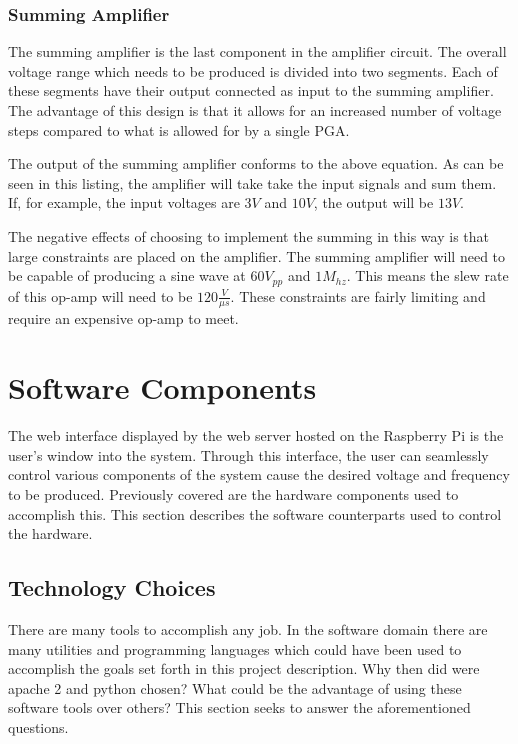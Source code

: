 \documentclass{article}	%
\begin{document}
\begin{multicols}{2}
\subsubsection{Summing Amplifier}
The summing amplifier is the last component
in the amplifier circuit.
The overall voltage range which needs to be produced is divided into two segments.
Each of these segments have their output connected as
input to the summing amplifier.
The advantage of this design is that
it allows for an increased number of voltage steps
compared to what is allowed for by a single PGA.

The output of the summing amplifier conforms to
the above equation.
As can be seen in this listing,
the amplifier will take take the input signals
and sum them.
If, for example, 
the input voltages are $3V$ and $10V$, the
output will be $13V$.

The negative effects of choosing to 
implement the summing in this way is
that large constraints are placed on the amplifier.
The summing amplifier will need to be capable
of producing a sine wave at $60V_{pp}$ and $1M_{hz}$.
This means the slew rate of this op-amp will need to be
$120 \frac{V}{\mu s}$.
These constraints are fairly limiting and require
an expensive op-amp to meet.

\section{Software Components}
The web interface displayed by
the web server hosted on the Raspberry Pi
is the user's window into the system.
Through this interface,
the user can seamlessly control various
components of the system cause 
the desired voltage and frequency 
to be produced.
Previously covered are
the hardware components used to accomplish this.
This section describes the software counterparts
used to control the hardware.

\subsection{Technology Choices}
There are many tools to accomplish any job.
In the software domain there are many utilities
and programming languages which could have been
used to accomplish the goals set forth in this project description.
Why then did were apache 2 and python chosen?
What could be the advantage of using these software tools over others?
This section seeks to answer the aforementioned questions.


\end{multicols}
\end{document}
